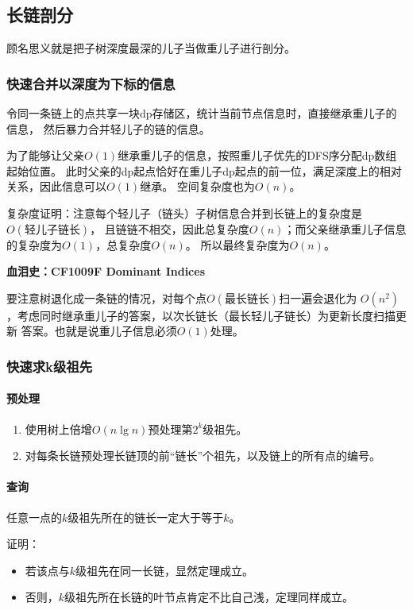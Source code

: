 \subsection{长链剖分}

顾名思义就是把子树深度最深的儿子当做重儿子进行剖分。

\subsubsection{快速合并以深度为下标的信息}
令同一条链上的点共享一块dp存储区，统计当前节点信息时，直接继承重儿子的信息，
然后暴力合并轻儿子的链的信息。

为了能够让父亲$O(1)$继承重儿子的信息，按照重儿子优先的DFS序分配dp数组起始位置。
此时父亲的dp起点恰好在重儿子dp起点的前一位，满足深度上的相对关系，因此信息可以$O(1)$继承。
空间复杂度也为$O(n)$。

复杂度证明：注意每个轻儿子（链头）子树信息合并到长链上的复杂度是$O(\textrm{轻儿子链长})$，
且链链不相交，因此总复杂度$O(n)$；而父亲继承重儿子信息的复杂度为$O(1)$，总复杂度$O(n)$。
所以最终复杂度为$O(n)$。

{\bfseries
血泪史：CF1009F Dominant Indices

要注意树退化成一条链的情况，对每个点$O(\textrm{最长链长})$扫一遍会退化为
$O(n^2)$，考虑同时继承重儿子的答案，以次长链长（最长轻儿子链长）为更新长度扫描更新
答案。也就是说重儿子信息必须$O(1)$处理。}



\subsubsection{快速求k级祖先}
\paragraph{预处理}
\begin{enumerate}
	\item 使用树上倍增$O(n\lg n)$预处理第$2^k$级祖先。
	\item 对每条长链预处理长链顶的前``链长''个祖先，以及链上的所有点的编号。
\end{enumerate}

\paragraph{查询}

\begin{theorem}\label{DBCBD}
	任意一点的$k$级祖先所在的链长一定大于等于$k$。
\end{theorem}
证明：
\begin{itemize}
	\item 若该点与$k$级祖先在同一长链，显然定理成立。
	\item 否则，$k$级祖先所在长链的叶节点肯定不比自己浅，定理同样成立。
\end{itemize}

